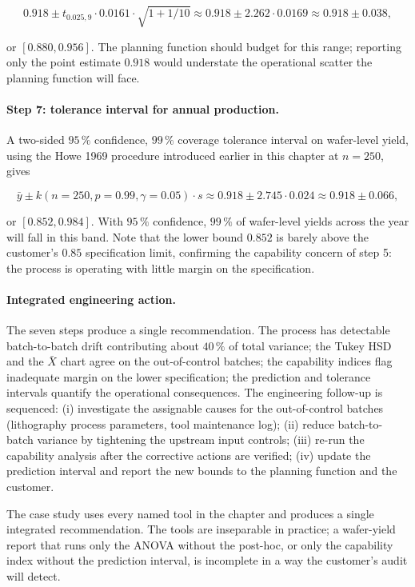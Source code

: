 \[
0.918 \pm t_{0.025, 9} \cdot 0.0161 \cdot \sqrt{1 + 1/10}
\approx 0.918 \pm 2.262 \cdot 0.0169
\approx 0.918 \pm 0.038,
\]

\noindent
or $[0.880, 0.956]$. The planning function should budget for
this range; reporting only the point estimate $0.918$ would
understate the operational scatter the planning function will
face.

\paragraph{Step 7: tolerance interval for annual production.}
A two-sided $95 \,\%$ confidence, $99 \,\%$ coverage tolerance
interval on wafer-level yield, using the Howe 1969 procedure
introduced earlier in this chapter \cite{paper:ch08t3p-howe-1969}
at $n = 250$, gives

\[
\bar{y} \pm k(n = 250, p = 0.99, \gamma = 0.05) \cdot s
\approx 0.918 \pm 2.745 \cdot 0.024
\approx 0.918 \pm 0.066,
\]

\noindent
or $[0.852, 0.984]$. With $95 \,\%$ confidence, $99 \,\%$ of
wafer-level yields across the year will fall in this band.
Note that the lower bound $0.852$ is barely above the customer's
$0.85$ specification limit, confirming the capability concern of
step 5: the process is operating with little margin on the
specification.

\paragraph{Integrated engineering action.} The seven steps
produce a single recommendation. The process has detectable
batch-to-batch drift contributing about $40 \,\%$ of total
variance; the Tukey HSD and the $\bar{X}$ chart agree on the
out-of-control batches; the capability indices flag inadequate
margin on the lower specification; the prediction and tolerance
intervals quantify the operational consequences. The
engineering follow-up is sequenced: (i) investigate the assignable
causes for the out-of-control batches (lithography process
parameters, tool maintenance log); (ii) reduce batch-to-batch
variance by tightening the upstream input controls; (iii)
re-run the capability analysis after the corrective actions are
verified; (iv) update the prediction interval and report the
new bounds to the planning function and the customer.

The case study uses every named tool in the chapter and produces
a single integrated recommendation. The tools are inseparable in
practice; a wafer-yield report that runs only the ANOVA without
the post-hoc, or only the capability index without the prediction
interval, is incomplete in a way the customer's audit will
detect.


